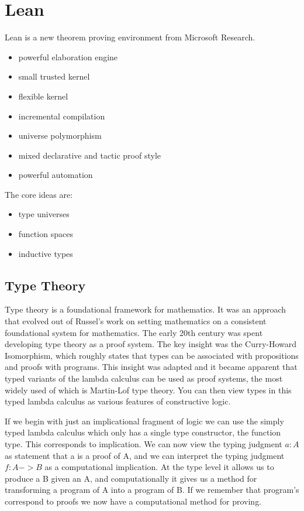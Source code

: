 \section{Lean}

Lean is a new theorem proving environment from Microsoft Research.
\begin{itemize}
    \item powerful elaboration engine
    \item small trusted kernel
    \item flexible kernel
    \item incremental compilation
    \item universe polymorphism
    \item mixed declarative and tactic proof style
    \item powerful automation
\end{itemize}

The core ideas are:
\begin{itemize}
    \item type universes
    \item function spaces
    \item inductive types
\end{itemize}

\subsection{Type Theory}
Type theory is a foundational framework for mathematics. It was an approach that evolved out of Russel's work on setting
mathematics on a consistent foundational system for mathematics. The early 20th century was spent developing type theory
as a proof system. The key insight was the Curry-Howard Isomorphism, which roughly states that types can be associated with
propositions and proofs with programs. This insight was adapted and it became apparent that typed variants of the lambda
calculus can be used as proof systems, the most widely used of which is Martin-Lof type theory. You can then view types in
this typed lambda calculus as various features of constructive logic.

If we begin with just an implicational fragment of logic we can use the simply typed lambda calculus which only has a
single type constructor, the function type. This corresponds to implication. We can now view the typing judgment $a : A$
as statement that a is a proof of A, and we can interpret the typing judgment $f : A -> B$ as a computational implication.
At the type level it allows us to produce a B given an A, and computationally it gives us a method for transforming a program
of A into a program of B. If we remember that program's correspond to proofs we now have a computational method for proving.


